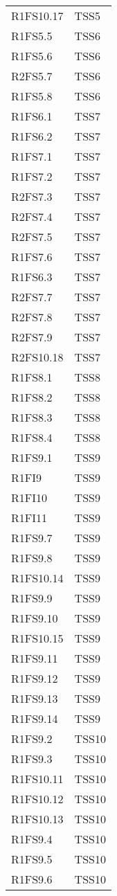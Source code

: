{\begin{longtable}{C{4cm} C{4cm}}
R1FS10.17 & TSS5 \\
R1FS5.5 & TSS6 \\
R1FS5.6 & TSS6 \\
R2FS5.7 & TSS6 \\
R1FS5.8 & TSS6 \\
R1FS6.1 & TSS7 \\
R1FS6.2 & TSS7 \\
R1FS7.1 & TSS7 \\
R1FS7.2 & TSS7 \\
R2FS7.3 & TSS7 \\
R2FS7.4 & TSS7 \\
R2FS7.5 & TSS7 \\
R1FS7.6 & TSS7 \\
R1FS6.3 & TSS7 \\
R2FS7.7 & TSS7 \\
R2FS7.8 & TSS7 \\
R2FS7.9 & TSS7 \\
R2FS10.18 & TSS7 \\
R1FS8.1 & TSS8 \\
R1FS8.2 & TSS8 \\
R1FS8.3 & TSS8 \\
R1FS8.4 & TSS8 \\
R1FS9.1 & TSS9 \\
R1FI9 & TSS9 \\
R1FI10 & TSS9 \\
R1FI11 & TSS9 \\
R1FS9.7 & TSS9 \\
R1FS9.8 & TSS9 \\
R1FS10.14 & TSS9 \\
R1FS9.9 & TSS9 \\
R1FS9.10 & TSS9 \\
R1FS10.15 & TSS9 \\
R1FS9.11 & TSS9 \\
R1FS9.12 & TSS9 \\
R1FS9.13 & TSS9 \\
R1FS9.14 & TSS9 \\
R1FS9.2 & TSS10 \\
R1FS9.3 & TSS10 \\
R1FS10.11 & TSS10 \\
R1FS10.12 & TSS10 \\
R1FS10.13 & TSS10 \\
R1FS9.4 & TSS10 \\
R1FS9.5 & TSS10 \\
R1FS9.6 & TSS10 \\

\end{longtable}
}























